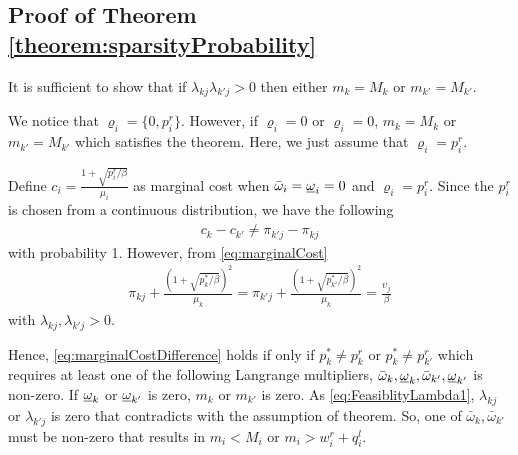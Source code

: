 \subsection{Proof of Theorem \ref{theorem:sparsityProbability}}
\label{proof:sparsityProbability}

It is sufficient to show that if $\lambda_{kj}\lambda_{k'j}> 0$ then either $m_k=M_k$ or $m_{k'} = M_{k'}$. 

We notice that $\varrho_i = \{0,p^r_i\}$. However, if $\varrho_i=0$ or $\varrho_i=0$, $m_k=M_k$ or $m_{k'} = M_{k'}$ which satisfies the theorem. Here, we just assume that $\varrho_i = p^r_i$.

Define $c_i = \frac{1+\sqrt{p^r_i/\beta}}{\mu_i}$ as marginal cost when $\bar{\omega}_i = \underbar{$\omega$}_i =0$ and $\varrho_i = p^r_i$. Since the $p^r_i$ is chosen from a continuous distribution, we have the following 
\begin{eqnarray}
\label{eq:marginalCostDifference}
c_k - c_{k'} \neq \pi_{k'j} - \pi_{kj}
\end{eqnarray}
with probability 1. However, from \eqref{eq:marginalCost}
\begin{eqnarray}
\pi_{kj} + \frac{(1+\sqrt{p^*_k/\beta})^2}{\mu_k} = \pi_{k'j} + \frac{(1+\sqrt{p^*_{k'}/\beta})^2}{\mu_k} = \frac{\upsilon_j}{\beta}
\end{eqnarray}
with $\lambda_{kj},\lambda_{k'j} > 0$.

Hence, \eqref{eq:marginalCostDifference}  holds if only if $p^*_k \neq p^r_k$ or $p^*_k \neq p^r_{k'}$ which requires at least one of the following Langrange multipliers, $\bar{\omega}_k, \underbar{$\omega$}_k, \bar{\omega}_{k'}, \underbar{$\omega$}_{k'}$ is non-zero. If $\underbar{$\omega$}_k $ or $\underbar{$\omega$}_{k'}$ is zero, $m_k$ or $m_{k'}$ is zero. As \eqref{eq:FeasiblityLambda1}, $\lambda_{kj}$ or $\lambda_{k'j}$ is zero that contradicts with the assumption of theorem. So, one of  $\bar{\omega}_k,  \bar{\omega}_{k'}$ must be non-zero that results in $m_i<M_i$ or $m_i>w^r_i + q^l_i$.